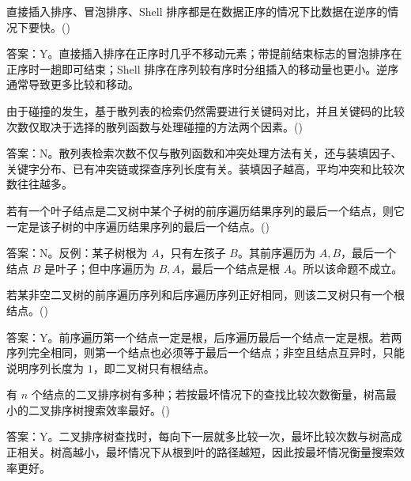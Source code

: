 \begin{question}
直接插入排序、冒泡排序、Shell 排序都是在数据正序的情况下比数据在逆序的情况下要快。(\quad)
\begin{solution}
答案：Y。直接插入排序在正序时几乎不移动元素；带提前结束标志的冒泡排序在正序时一趟即可结束；Shell 排序在序列较有序时分组插入的移动量也更小。逆序通常导致更多比较和移动。
\end{solution}
\end{question}

\begin{question}
由于碰撞的发生，基于散列表的检索仍然需要进行关键码对比，并且关键码的比较次数仅取决于选择的散列函数与处理碰撞的方法两个因素。(\quad)
\begin{solution}
答案：N。散列表检索次数不仅与散列函数和冲突处理方法有关，还与装填因子、关键字分布、已有冲突链或探查序列长度有关。装填因子越高，平均冲突和比较次数往往越多。
\end{solution}
\end{question}

\begin{question}
若有一个叶子结点是二叉树中某个子树的前序遍历结果序列的最后一个结点，则它一定是该子树的中序遍历结果序列的最后一个结点。(\quad)
\begin{solution}
答案：N。反例：某子树根为 $A$，只有左孩子 $B$。其前序遍历为 $A,B$，最后一个结点 $B$ 是叶子；但中序遍历为 $B,A$，最后一个结点是根 $A$。所以该命题不成立。
\end{solution}
\end{question}

\begin{question}
若某非空二叉树的前序遍历序列和后序遍历序列正好相同，则该二叉树只有一个根结点。(\quad)
\begin{solution}
答案：Y。前序遍历第一个结点一定是根，后序遍历最后一个结点一定是根。若两序列完全相同，则第一个结点也必须等于最后一个结点；非空且结点互异时，只能说明序列长度为 $1$，即二叉树只有根结点。
\end{solution}
\end{question}

\begin{question}
有 $n$ 个结点的二叉排序树有多种；若按最坏情况下的查找比较次数衡量，树高最小的二叉排序树搜索效率最好。(\quad)
\begin{solution}
答案：Y。二叉排序树查找时，每向下一层就多比较一次，最坏比较次数与树高成正相关。树高越小，最坏情况下从根到叶的路径越短，因此按最坏情况衡量搜索效率更好。
\end{solution}
\end{question}

